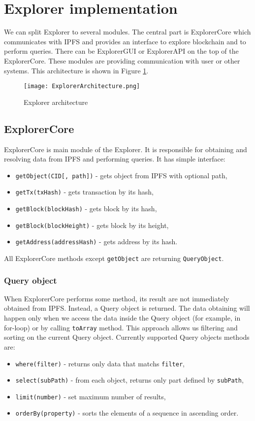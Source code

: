 \section{Explorer implementation}
We can split Explorer to several modules. The central part is ExplorerCore which communicates with IPFS and provides an interface to explore blockchain and to perform queries. There can be ExplorerGUI or ExplorerAPI on the top of the ExplorerCore. These modules are providing communication with user or other systems. This architecture is shown in Figure \ref{ExplorerArchitecture}.

\begin{figure}[h]
    \centering
    \texttt{[image: ExplorerArchitecture.png]}
    \caption{Explorer architecture}
    \label{ExplorerArchitecture}
\end{figure}

\subsection{ExplorerCore}
ExplorerCore is main module of the Explorer. It is responsible for obtaining and resolving data from IPFS and performing queries. It has simple interface:
\begin{itemize}
    \item \texttt{getObject(CID[, path])} - gets object from IPFS with optional path,
    \item \texttt{getTx(txHash)} - gets transaction by its hash,
    \item \texttt{getBlock(blockHash)} - gets block by its hash,
    \item \texttt{getBlock(blockHeight)} - gets block by its height,
    \item \texttt{getAddress(addressHash)} - gets address by its hash.
\end{itemize}
All ExplorerCore methods except \texttt{getObject} are returning \texttt{QueryObject}.

\subsubsection{Query object}
When ExplorerCore performs some method, its result are not immediately obtained from IPFS. Instead, a Query object is returned. The data obtaining will happen only when we access the data inside the Query object (for example, in for-loop) or by calling \texttt{toArray} method. This approach allows us filtering and sorting on the current Query object. Currently supported Query objects methods are:
\begin{itemize}
    \item \texttt{where(filter)} - returns only data that matchs \texttt{filter},
    \item \texttt{select(subPath)} - from each object, returns only part defined by \texttt{subPath},
    \item \texttt{limit(number)} - set maximum number of results,
    \item \texttt{orderBy(property)} - sorts the elements of a sequence in ascending order.
\end{itemize}

